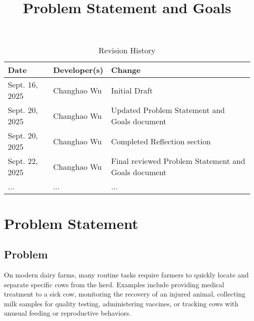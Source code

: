 \documentclass{article}
\title{Problem Statement and Goals\\\progname}
\author{\authname}
\date{}
\begin{document}
\maketitle

\begin{table}[hp]
    \caption{Revision History} \label{TblRevisionHistory}
        \begin{tabularx}{\textwidth}{llX}
        \toprule
        \textbf{Date} & \textbf{Developer(s)} & \textbf{Change}\\
        \midrule
            Sept. 16, 2025  & Changhao Wu           & Initial Draft                                         \\
            Sept. 20, 2025  & Changhao Wu           & Updated Problem Statement and Goals document          \\
            Sept. 20, 2025  & Changhao Wu           & Completed Reflection section                          \\
            Sept. 22, 2025  & Changhao Wu           & Final reviewed Problem Statement and Goals document   \\
            ...             & ...                   & ...                                                   \\
        \bottomrule
        \end{tabularx}
\end{table}

\section{Problem Statement}




\subsection{Problem}

    On modern dairy farms, many routine tasks require farmers to quickly locate and 
    separate specific cows from the herd. Examples include providing medical treatment 
    to a sick cow, monitoring the recovery of an injured animal, collecting milk samples 
    for quality testing, administering vaccines, or tracking cows with unusual feeding 
    or reproductive behaviors.  
\end{document}
